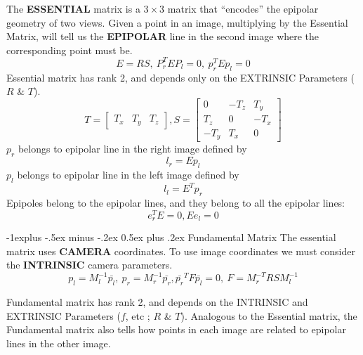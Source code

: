 \documentclass[10pt,landscape]{article}
\makeatletter
\renewcommand{\subsection}{\@startsection{subsection}{2}{0mm}%
                                {-1explus -.5ex minus -.2ex}%
                                {0.5ex plus .2ex}%
                                {\normalfont\normalsize\bfseries}}
\makeatother
\begin{document}
\begin{multicols}{3}
The \textbf{ESSENTIAL} matrix is a $3\times3$ matrix that “encodes” the epipolar geometry of two views. Given a point in an image, multiplying by the Essential Matrix, will tell us the \textbf{EPIPOLAR} line in the second image where the corresponding point must be.\\
\begin{equation*}
    E=RS,\ P^T_rEP_l = 0,\ p^T_rEp_l = 0 
\end{equation*}
Essential matrix has rank 2, and depends only on the EXTRINSIC Parameters ($R$ \& $T$).
\begin{equation*}
T =\left[ \begin{array}{ccc}
T_x & T_y & T_z
\end{array} \right ], S = \left[ \begin{array}{ccc}
0 & -T_z & T_y\\
T_z & 0 & -T_x\\
-T_y & T_x & 0
\end{array} \right ]
\end{equation*}
$p_r$ belongs to epipolar line in the right image defined by
\begin{equation*}
    l_r = Ep_l
\end{equation*}
$p_l$ belongs to epipolar line in the left image defined by 
\begin{equation*}
    l_l = E^Tp_r
\end{equation*}
Epipoles belong to the epipolar lines, and they belong to all the epipolar lines:
\begin{equation*}
    e^T_rE=0, Ee_l=0
\end{equation*}



\subsection{Fundamental Matrix}
The essential matrix uses \textbf{CAMERA} coordinates. To use image coordinates we must consider the \textbf{INTRINSIC} camera parameters.
\begin{equation*}
    p_l=M_l^{-1}\bar{p_l},\ p_r=M_r^{-1}\bar{p_r}, \bar{p_r}^TF\bar{p_l}=0,\ F=M_r^{-T}RSM^{-1}_l
\end{equation*}


Fundamental matrix has rank 2, and depends on the INTRINSIC and EXTRINSIC Parameters ($f$, etc ; $R$ \& $T$). Analogous to the Essential matrix, the Fundamental matrix also tells how points in each image are related to epipolar lines in the other image.



\end{multicols}
\end{document}
